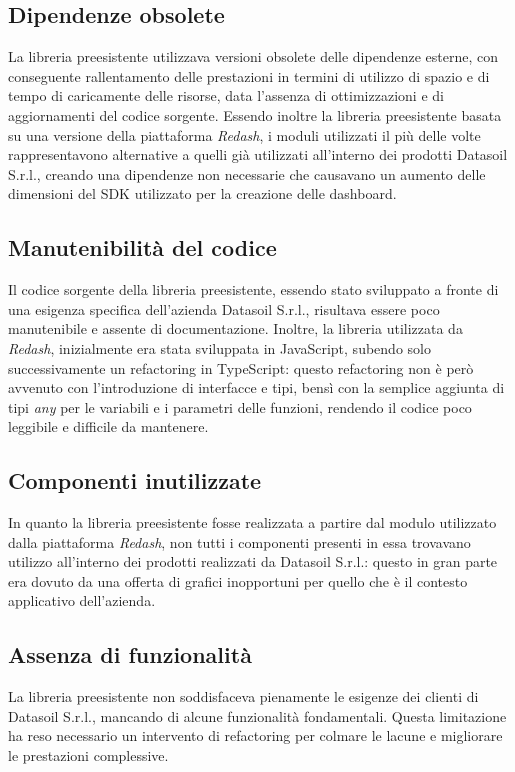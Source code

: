 \subsection{Dipendenze obsolete}
La libreria preesistente utilizzava versioni obsolete delle dipendenze esterne, con conseguente rallentamento delle prestazioni in termini
di utilizzo di spazio e di tempo di caricamente delle risorse, data l'assenza di ottimizzazioni e di aggiornamenti del codice sorgente. \newline
Essendo inoltre la libreria preesistente basata su una versione della piattaforma \textit{Redash}, i moduli utilizzati il più delle volte
rappresentavono alternative a quelli già utilizzati all'interno dei prodotti Datasoil S.r.l., creando una dipendenze non necessarie che 
causavano un aumento delle dimensioni del SDK utilizzato per la creazione delle dashboard.

\subsection{Manutenibilità del codice}
Il codice sorgente della libreria preesistente, essendo stato sviluppato a fronte di una esigenza specifica dell'azienda Datasoil S.r.l.,
risultava essere poco manutenibile e assente di documentazione. \newline
Inoltre, la libreria utilizzata da \textit{Redash}, inizialmente era stata sviluppata in JavaScript, subendo solo successivamente un 
refactoring in TypeScript: questo refactoring non è però avvenuto con l'introduzione di interfacce e tipi, bensì con la semplice aggiunta 
di tipi \textit{any} per le variabili e i parametri delle funzioni, rendendo il codice poco leggibile e difficile da mantenere.

\subsection{Componenti inutilizzate}
In quanto la libreria preesistente fosse realizzata a partire dal modulo utilizzato dalla piattaforma \textit{Redash}, non tutti i componenti presenti 
in essa trovavano utilizzo all'interno dei prodotti realizzati da Datasoil S.r.l.: questo in gran parte era dovuto da una offerta di grafici inopportuni
per quello che è il contesto applicativo dell'azienda.

\subsection{Assenza di funzionalità}
La libreria preesistente non soddisfaceva pienamente le esigenze dei clienti di Datasoil S.r.l., mancando di alcune funzionalità fondamentali. 
Questa limitazione ha reso necessario un intervento di refactoring per colmare le lacune e migliorare le prestazioni complessive.

